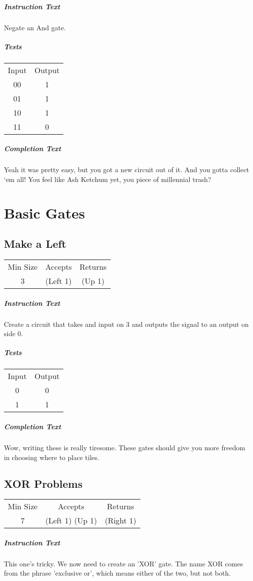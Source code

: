 \documentclass[a4paper, 12pt]{article}
\begin{document}
\subparagraph{Instruction Text}
Negate an And gate.

\subparagraph{Tests}
\begin{tabular}{cc}
	Input & Output \\
	00 & 1 \\
	01 & 1 \\
	10 & 1 \\
	11 & 0
\end{tabular}

\subparagraph{Completion Text}
Yeah it was pretty easy, but you got a new circuit out of it. And you gotta collect ‘em all! You feel like Ash Ketchum yet, you piece of millennial trash?

\section{Basic Gates}

\subsection{Make a Left}
\begin{tabular}{ccc}
	Min Size & Accepts & Returns \\
	3 & (Left 1) & (Up 1)
\end{tabular}

\subparagraph{Instruction Text}
Create a circuit that takes and input on 3 and outputs the signal to an output on side 0.

\subparagraph{Tests}
\begin{tabular}{cc}
	Input & Output \\
	0 & 0 \\
	1 & 1
\end{tabular}

\subparagraph{Completion Text}
Wow, writing these is really tiresome. These gates should give you more freedom in choosing where to place tiles.
\subsection{XOR Problems}
\begin{tabular}{ccc}
	Min Size & Accepts & Returns \\
	7 & (Left 1) (Up 1) & (Right 1)
\end{tabular}

\subparagraph{Instruction Text}
This one’s tricky. We now need to create an 'XOR' gate. The name XOR comes from the phrase 'exclusive or', which means either of the two, but not both.
\end{document}
